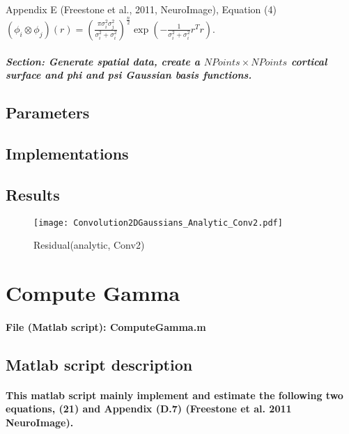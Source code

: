 \documentclass[a4paper, 12pt, english]{article}
\begin{document}
Appendix E (Freestone et al., 2011, NeuroImage), Equation (4) $\left(\phi_{i}\otimes\phi_{j}\right)(r)=(\frac{\pi\sigma_{i}^{2}\sigma_{j}^{2}}{\sigma_{i}^{2}+\sigma_{i}^{2}})^{\frac{n}{2}}\exp(-\frac{1}{\sigma_{i}^{2}+\sigma_{i}^{2}}r^{T}r)$.

\subparagraph{Section: Generate spatial data, create a $NPoints\times NPoints$ cortical surface and phi and psi Gaussian basis functions.\\}


\subsection{Parameters}



\subsection{Implementations}



\subsection{Results}
\begin{figure}[H]
\centering
\texttt{[image: Convolution2DGaussians\_Analytic\_Conv2.pdf]}
\caption{Residual(analytic, Conv2)}\label{Convolution2DGaussians_Analytic_Conv2.pdf}
\end{figure}



\newpage




\section{Compute Gamma}

\paragraph{File (Matlab script): ComputeGamma.m}

\subsection*{Matlab script description}

\paragraph{This matlab script mainly implement and estimate the following two
equations, (21) and Appendix (D.7) (Freestone et al. 2011 NeuroImage).}
\end{document}
